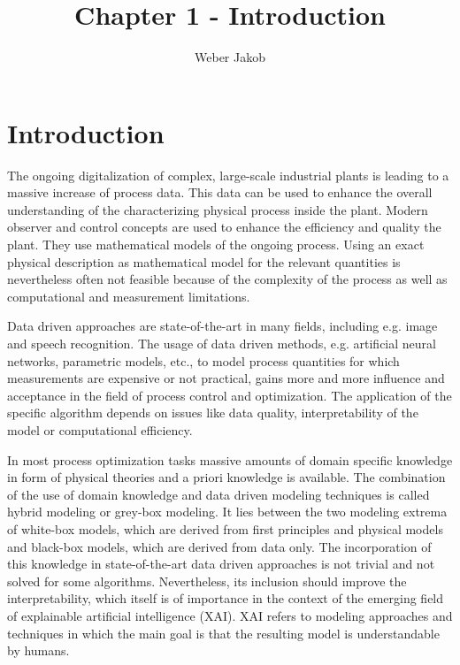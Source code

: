 \documentclass[10pt,a4paper]{article}
\title{Chapter 1 - Introduction}
\author{Weber Jakob}
\begin{document}
	\maketitle

\tableofcontents

\section{Introduction}

The ongoing digitalization of complex, large-scale industrial plants is leading to a massive increase of process data. This data can be used to enhance the overall understanding of the characterizing physical process inside the plant. Modern observer and control concepts are used to enhance the efficiency and quality the plant. They use mathematical models of the ongoing process. Using an exact physical description as mathematical model for the relevant quantities is nevertheless often not feasible because of the complexity of the process as well as computational and measurement limitations.

Data driven approaches are state-of-the-art in many fields, including e.g. image and speech recognition. The usage of data driven methods, e.g. artificial neural networks, parametric models, etc., to model process quantities for which measurements are expensive or not practical, gains more and more influence and acceptance in the field of process control and optimization. The application of the specific algorithm depends on issues like data quality, interpretability of the model or computational efficiency. 

In most process optimization tasks massive amounts of domain specific knowledge in form of physical theories and a priori knowledge is available. The combination of the use of domain knowledge and data driven modeling techniques is called hybrid modeling or grey-box modeling. It lies between the two modeling extrema of white-box models, which are derived from first principles and physical models and black-box models, which are derived from data only.\cite{ashby1961introduction} The incorporation of this knowledge in state-of-the-art data driven approaches is not trivial and not solved for some algorithms. Nevertheless, its inclusion should improve the interpretability, which itself is of importance in the context of the emerging field of explainable artificial intelligence (XAI). XAI refers to modeling approaches and techniques in which the main goal is that the resulting model is understandable by humans. \cite{dovsilovic2018explainable}
\end{document}
